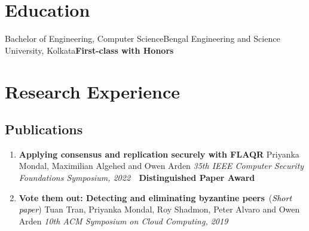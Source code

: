 \documentclass[9pt,a4paper]{moderncv}
\begin{document}
\makecvtitle
\vspace{-1cm}
\section{Education}
\vspace{0.2cm}
{Bachelor of Engineering, Computer Science}{Bengal Engineering and Science University, Kolkata}{}{\textbf{First-class with Honors}}{}
\section{Research Experience}
\vspace{0.1cm}
\hspace{-0.1cm}
\hspace{-0.1cm}
\subsection{Publications}
\begin{enumerate}
\item{\textbf{Applying consensus and replication securely with FLAQR}}
\newline Priyanka Mondal, Maximilian Algehed and Owen Arden \newline
\textit{35th IEEE Computer Security Foundations Symposium, 2022~~}{\textbf{\textsf{\textcolor{bittersweet}{Distinguished Paper Award}}}}
\item{\textbf{Vote them out: Detecting and eliminating byzantine peers}}~({\textit{\textsf{\textcolor{black}{Short paper}}}})
\newline Tuan Tran, Priyanka Mondal, Roy Shadmon, Peter Alvaro and Owen Arden \newline
\textit{10th ACM Symposium on Cloud Computing, 2019~~}
\end{enumerate}
\end{document}
